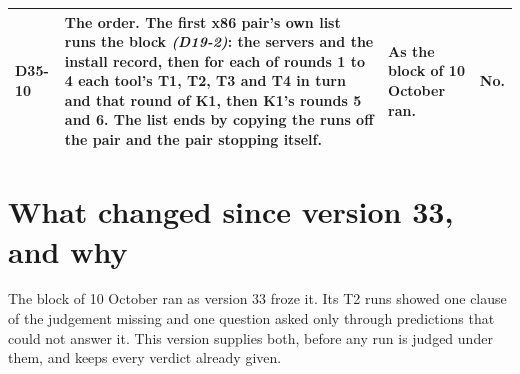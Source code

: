 \documentclass[11pt]{article}
\newcommand{\gl}[1]{{\color{soft}\itshape\small (#1)}}
\begin{document}
{\begin{longtable}{@{}p{1.1cm} >{\raggedright\arraybackslash}p{6.1cm} >{\raggedright\arraybackslash}p{6.0cm} >{\raggedright\arraybackslash}p{2.2cm}@{}}
D35-10 & The order. The first x86 pair's own list runs the block \gl{D19-2}: the servers and the install record, then for each of rounds 1 to 4 each tool's T1, T2, T3 and T4 in turn and that round of K1, then K1's rounds 5 and 6. The list ends by copying the runs off the pair and the pair stopping itself. & As the block of 10 October ran. & \textbf{No.} \\
\bottomrule
\end{longtable}}

\section*{What changed since version 33, and why}
The block of 10 October ran as version 33 froze it. Its T2 runs showed one clause of the
judgement missing and one question asked only through predictions that could not answer it. This
version supplies both, before any run is judged under them, and keeps every verdict already given.
\end{document}
